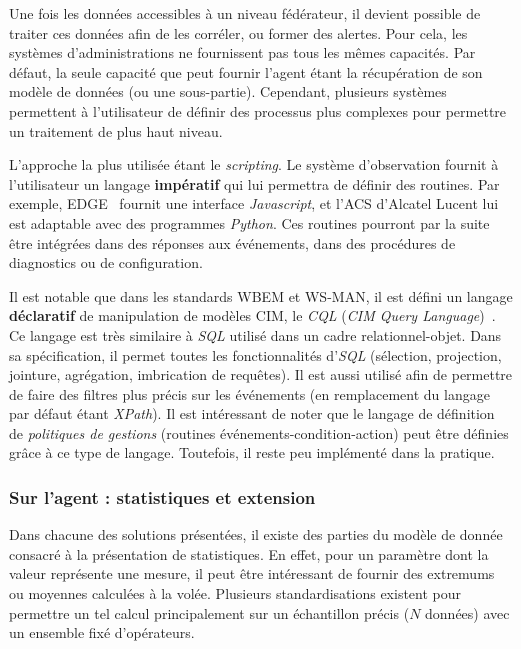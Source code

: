 Une fois les données accessibles à un niveau fédérateur, il devient possible de traiter ces données afin de les corréler, ou former des alertes. Pour cela, les systèmes d'administrations ne fournissent pas tous les mêmes capacités. Par défaut, la seule capacité que peut fournir l'agent étant la récupération de son modèle de données (ou une sous-partie). Cependant, plusieurs systèmes permettent à l'utilisateur de définir des processus plus complexes pour permettre un traitement de plus haut niveau.

L'approche la plus utilisée étant le \textit{scripting}. Le système d'observation fournit à l'utilisateur un langage \textbf{impératif} qui lui permettra de définir des routines. Par exemple, EDGE~\cite{Motorola:EDGE} fournit une interface \textit{Javascript}, et l'ACS d'Alcatel Lucent lui est adaptable avec des programmes \textit{Python}. Ces routines pourront par la suite être intégrées dans des réponses aux événements, dans des procédures de diagnostics ou de configuration.

Il est notable que dans les standards WBEM et WS-MAN, il est défini un langage \textbf{déclaratif} de manipulation de modèles CIM, le \textit{CQL} (\textit{CIM Query Language})~\cite{DMTF:CIM-QL}. Ce langage est très similaire à \textit{SQL} utilisé dans un cadre relationnel-objet. Dans sa spécification, il permet toutes les fonctionnalités d'\textit{SQL} (sélection, projection, jointure, agrégation, imbrication de requêtes). Il est aussi utilisé afin de permettre de faire des filtres plus précis sur les événements (en remplacement du langage par défaut étant \textit{XPath}). Il est intéressant de noter que le langage de définition de \textit{politiques de gestions} (routines événements-condition-action) peut être définies grâce à ce type de langage. Toutefois, il reste peu implémenté dans la pratique.

\subsubsection{Sur l'agent : statistiques et extension}
Dans chacune des solutions présentées, il existe des parties du modèle de donnée consacré à la présentation de statistiques. En effet, pour un paramètre dont la valeur représente une mesure, il peut être intéressant de fournir des extremums ou moyennes calculées à la volée. Plusieurs standardisations existent pour permettre un tel calcul principalement sur un échantillon précis ($N$ données) avec un ensemble fixé d'opérateurs.

